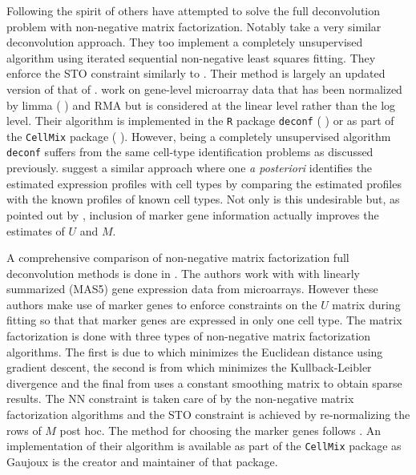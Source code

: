 \documentclass[reqno,12pt,oneside]{report}\usepackage[]{graphicx}\usepackage[]{color}
\renewcommand{\citet}[1]{(\citeauthor{#1} \citeyear{#1})}
\theoremstyle{plain}
\theoremstyle{definition}
\theoremstyle{remark}
\numberwithin{theorem}{chapter}     %
\begin{document}
Following the spirit of \citeauthor{Venet2001} others have attempted to solve the full deconvolution problem with non-negative matrix factorization. Notably \cite{Repsilber2010} take a very similar deconvolution approach. They too implement a completely unsupervised algorithm using iterated sequential non-negative least squares fitting. They enforce the STO constraint similarly to \citeauthor{Venet2001}. Their method is largely an updated version of that of \citeauthor{Venet2001}. \citeauthor{Repsilber2010} work on gene-level microarray data that has been normalized by limma \citet{Ritchie2015} and RMA  but is considered at the linear level rather than the log level. Their algorithm is implemented in the \verb+R+ package \verb+deconf+ \citet{Repsilber2010} or as part of the \verb+CellMix+ package \citet{Gaujoux2013}. However, being a completely unsupervised algorithm \verb+deconf+ suffers from the same cell-type identification problems as discussed previously. \citeauthor{Repsilber2010} suggest a similar approach where one \emph{a posteriori} identifies the estimated expression profiles with cell types by comparing the estimated profiles with the known profiles of known cell types. Not only is this undesirable but, as pointed out by \cite{Gaujoux2012}, inclusion of marker gene information actually improves the estimates of $U$ and $M$.

A comprehensive comparison of non-negative matrix factorization full deconvolution methods is done in \cite{Gaujoux2012}. The authors work with with linearly summarized (MAS5) gene expression data from microarrays. However these authors make use of marker genes to enforce constraints on the $U$ matrix during fitting so that that marker genes are expressed in only one cell type. The matrix factorization is done with three types of non-negative matrix factorization algorithms. The first is due to \cite{lee2000} which minimizes the Euclidean distance using gradient descent, the second is from \cite{Brunet2004} which minimizes the Kullback-Leibler divergence and the final from \cite{Pascual-montano2006} uses a constant smoothing matrix to obtain sparse results. The NN constraint is taken care of by the non-negative matrix factorization algorithms and the STO constraint is achieved by re-normalizing the rows of $M$ post hoc. The method for choosing the marker genes follows \cite{Abbas2009}. An implementation of their algorithm is available as part of the \verb+CellMix+ package as Gaujoux is the creator and maintainer of that package.
\end{document}
